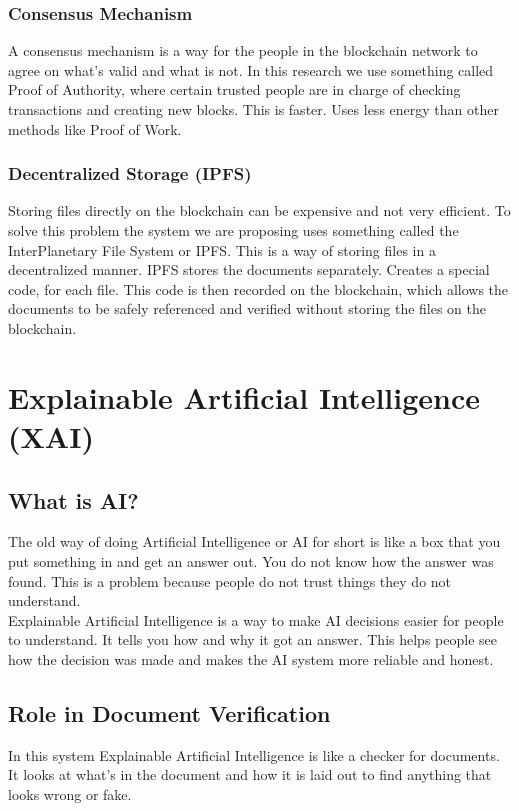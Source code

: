         \subsubsection{Consensus Mechanism}
            A consensus mechanism is a way for the people in the blockchain network to agree on what's valid and what is not. In this research we use something called Proof of Authority, where certain trusted people are in charge of checking transactions and creating new blocks. This is faster. Uses less energy than other methods like Proof of Work.
        \subsubsection{Decentralized Storage (IPFS)}
            Storing files directly on the blockchain can be expensive and not very efficient. To solve this problem the system we are proposing uses something called the InterPlanetary File System or IPFS. This is a way of storing files in a decentralized manner. IPFS stores the documents separately. Creates a special code, for each file. This code is then recorded on the blockchain, which allows the documents to be safely referenced and verified without storing the files on the blockchain. 
        
\section{Explainable Artificial Intelligence (XAI)}
    \subsection{What is AI?}
        The old way of doing Artificial Intelligence or AI for short is like a box that you put something in and get an answer out. You do not know how the answer was found. This is a problem because people do not trust things they do not understand.
        \\
        Explainable Artificial Intelligence is a way to make AI decisions easier for people to understand. It tells you how and why it got an answer. This helps people see how the decision was made and makes the AI system more reliable and honest.
    \subsection{Role in Document Verification}
        In this system Explainable Artificial Intelligence is like a checker for documents. It looks at what's in the document and how it is laid out to find anything that looks wrong or fake.
